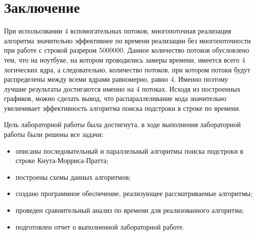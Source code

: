 \chapter*{Заключение}
При испольозвании 4 вспомогательных потоков, многопоточная реализация алгоритма значительно эффективнее по времени реализации без многопоточности при работе с строкой разрером 5000000.
Данное количество потоков обусловлено тем, что на ноутбуке, на котором проводились замеры времени, имеется всего 4 логических ядра, а следовательно, количество потоков, при котором потоки будут распределены между всеми ядрами равномерно, равно 4.
Именно поэтому лучшие результаты достигаются именно на 4 потоках.
Исходя из построенных графиков, можно сделать вывод, что распараллеливание кода значительно увеличивает эффективность алгоритма поиска подстроки в строке по времени.

Цель лабораторной работы была достигнута, в ходе выполнения лабораторной работы были решены все задачи:
\begin{itemize}
	\item описаны последовательный и параллельный алгоритмы поиска подстроки в строке Кнута-Морриса-Пратта;
	\item построены схемы данных алгоритмов;
	\item создано программное обеспечение, реализующее рассматриваемые алгоритмы;
	\item проведен сравнительный анализ по времени для реализованного алгоритма;
	\item подготовлен отчет о выполненной лабораторной работе.
\end{itemize}
